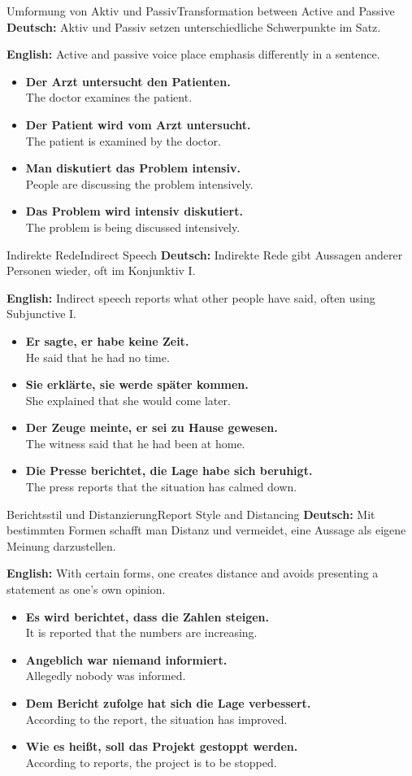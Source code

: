 \documentclass[a4paper,11pt]{article}
\newcommand{\GermanText}[1]{\textbf{Deutsch: }#1\par}
\newcommand{\EnglishText}[1]{{\color{SoftGray}\textbf{English: }#1\par}}
\newcommand{\ExampleItem}[2]{\item \textbf{#1}\\{\color{SoftGray}#2}}
\begin{document}
\begin{grammarentry}{Umformung von Aktiv und Passiv}{Transformation between Active and Passive}
    \GermanText{Aktiv und Passiv setzen unterschiedliche Schwerpunkte im Satz.}
    \EnglishText{Active and passive voice place emphasis differently in a sentence.}
    \begin{exbox}
        \begin{itemize}
            \ExampleItem{Der Arzt untersucht den Patienten.}{The doctor examines the patient.}
            \ExampleItem{Der Patient wird vom Arzt untersucht.}{The patient is examined by the doctor.}
            \ExampleItem{Man diskutiert das Problem intensiv.}{People are discussing the problem intensively.}
            \ExampleItem{Das Problem wird intensiv diskutiert.}{The problem is being discussed intensively.}
        \end{itemize}
    \end{exbox}
\end{grammarentry}

\begin{grammarentry}{Indirekte Rede}{Indirect Speech}
    \GermanText{Indirekte Rede gibt Aussagen anderer Personen wieder, oft im Konjunktiv I.}
    \EnglishText{Indirect speech reports what other people have said, often using Subjunctive I.}
    \begin{exbox}
        \begin{itemize}
            \ExampleItem{Er sagte, er habe keine Zeit.}{He said that he had no time.}
            \ExampleItem{Sie erklärte, sie werde später kommen.}{She explained that she would come later.}
            \ExampleItem{Der Zeuge meinte, er sei zu Hause gewesen.}{The witness said that he had been at home.}
            \ExampleItem{Die Presse berichtet, die Lage habe sich beruhigt.}{The press reports that the situation has calmed down.}
        \end{itemize}
    \end{exbox}
\end{grammarentry}

\begin{grammarentry}{Berichtsstil und Distanzierung}{Report Style and Distancing}
    \GermanText{Mit bestimmten Formen schafft man Distanz und vermeidet, eine Aussage als eigene Meinung darzustellen.}
    \EnglishText{With certain forms, one creates distance and avoids presenting a statement as one's own opinion.}
    \begin{exbox}
        \begin{itemize}
            \ExampleItem{Es wird berichtet, dass die Zahlen steigen.}{It is reported that the numbers are increasing.}
            \ExampleItem{Angeblich war niemand informiert.}{Allegedly nobody was informed.}
            \ExampleItem{Dem Bericht zufolge hat sich die Lage verbessert.}{According to the report, the situation has improved.}
            \ExampleItem{Wie es heißt, soll das Projekt gestoppt werden.}{According to reports, the project is to be stopped.}
        \end{itemize}
    \end{exbox}
\end{grammarentry}
\end{document}
